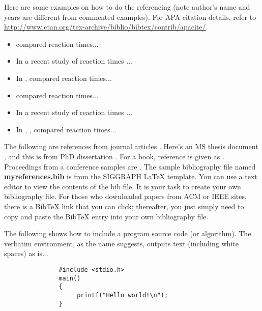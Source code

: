 
Here are some examples on how to do the referencing (note author's name and years are different from commented examples).  
For APA citation details, refer to \url{http://www.ctan.org/tex-archive/biblio/bibtex/contrib/apacite/}. 

\begin{itemize}
 \item {} compared reaction times...
 \item In a recent study of reaction times \cite{kartch:2000:ERA}...
 \item In , \citeauthor{kartch:2000:ERA} compared reaction times...
 \item {} compared reaction times... 
 \item In a recent study of reaction times \cite{fedkiw:2001:VSO}...
 \item In , , compared reaction times...
\end{itemize}

The following are references from journal articles \cite{Park:2006:DSI, Pellacini:2005:LAH, sako:2001:SSB}.
 Here's an MS thesis document \cite{yee:2000:SSA}, and this is from PhD dissertation \cite{kartch:2000:ERA}. 
 For a book, reference is given as  \cite{parke:1996:CFA}. 
 Proceedings from a conference samples are \cite{Jobs95, fedkiw:2001:VSO, levoy:2000:TDM}.  
 The sample bibliography file named \textbf{myreferences.bib} is from the SIGGRAPH \LaTeX{}  template.  
 You can use a text editor to view the contents of the bib file.  
 It is your task to create your own bibliography file.  
 For those who downloaded papers from ACM or IEEE sites, there is a BibTeX link that you can click; thereafter, you just simply need to copy and paste the BibTeX entry into your own bibliography file.

The following shows how to include a program source code (or algorithm).  
The verbatim environment, as the name suggests, outputs text (including white spaces) as is...

\begin{verbatim}
               #include <stdio.h>
               main()
               {
                    printf("Hello world!\n");
               }
\end{verbatim}

